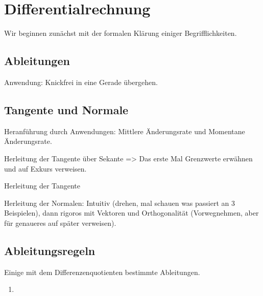 \chapter{Differentialrechnung}
Wir beginnen zunächst mit der formalen  Klärung einiger Begrifflichkeiten. 

\section{Ableitungen}

Anwendung: Knickfrei in eine Gerade übergehen. 

\section{Tangente und Normale}
Heranführung durch Anwendungen: Mittlere Änderungsrate und Momentane Änderungsrate. 

Herleitung der Tangente über Sekante
=> Das erste Mal Grenzwerte erwähnen und auf Exkurs verweisen. 

\begin{definition}[Differenzenquotient]
    
\end{definition}

\begin{definition}
    
\end{definition}

Herleitung der Tangente

\begin{definition}
    
\end{definition}


Herleitung der Normalen: Intuitiv (drehen, mal schauen was passiert an 3 Beispielen), dann rigoros mit Vektoren und Orthogonalität (Vorwegnehmen, aber für genaueres auf später verweisen). 

\begin{definition}
    
\end{definition}

\section{Ableitungsregeln}
Einige mit dem Differenzenquotienten bestimmte Ableitungen. 
\begin{example}
    \begin{enumerate}
        \item 
    \end{enumerate}
\end{example}

